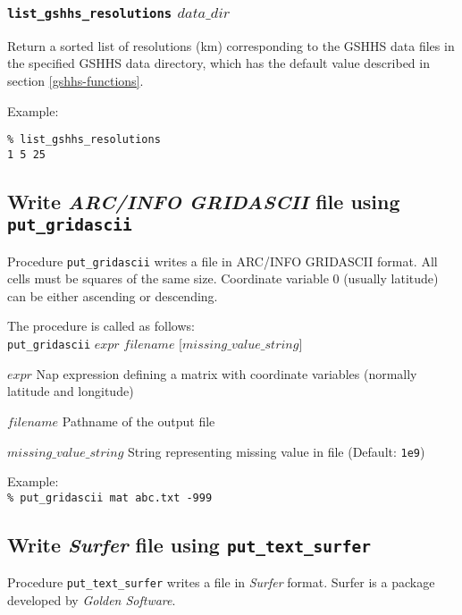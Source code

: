 \subsubsection{\texttt{list\_gshhs\_resolutions} $\mathit{data\_dir}$}
    \label{geog-proc-list-gshhs-resolutions}

Return a sorted list of resolutions (km) corresponding to the GSHHS data files in the
specified GSHHS data directory, which has the default value described in
	section \ref{gshhs-functions}.

Example: \\
\begin{verbatim}
% list_gshhs_resolutions
1 5 25
\end{verbatim}

\subsection{Write \emph{ARC/INFO GRIDASCII} file using \texttt{put\_gridascii}}
    \label{geog-proc-put-gridascii}

Procedure 
  \texttt{put\_gridascii} writes a file in ARC/INFO GRIDASCII
  format. All cells must be squares of the same size. Coordinate
  variable 0 (usually latitude) can be either ascending or descending.

The procedure is called as follows: \\
  \texttt{put\_gridascii} $\mathit{expr}$ $\mathit{filename}$ [$\mathit{missing\_value\_string}$]
  \begin{simpleitems}
    \item $\mathit{expr}$
    Nap expression defining a matrix with coordinate variables (normally latitude and longitude)
    \item $\mathit{filename}$
    Pathname of the output file
    \item $\mathit{missing\_value\_string}$
    String representing missing value in file (Default: \texttt{1e9})
  \end{simpleitems}

Example: \\
  \texttt{\% put\_gridascii mat abc.txt -999}

  \subsection{Write \emph{Surfer} file using \texttt{put\_text\_surfer}}
    \label{geog-proc-put-text-surfer}

Procedure 
  \texttt{put\_text\_surfer} writes a file in 
  \emph{Surfer} format. Surfer is a package developed by 
  \emph{Golden Software}.

